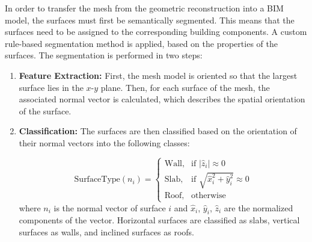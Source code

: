 \begin{English}
    In order to transfer the mesh from the geometric reconstruction into a BIM model, the surfaces must first be semantically segmented. This means that the surfaces need to be assigned to the corresponding building components. A custom rule-based segmentation method is applied, based on the properties of the surfaces. The segmentation is performed in two steps:

    \begin{enumerate}
        \item \textbf{Feature Extraction:} First, the mesh model is oriented so that the largest surface lies in the $x$-$y$ plane. Then, for each surface of the mesh, the associated normal vector is calculated, which describes the spatial orientation of the surface.
        \item \textbf{Classification:} The surfaces are then classified based on the orientation of their normal vectors into the following classes:
        
        \begin{equation*}
        \text{SurfaceType}(n_i) = 
        \begin{cases}
            \text{Wall}, & \text{if } |\hat{z}_i| \approx 0 \\
            \text{Slab}, & \text{if } \sqrt{\hat{x}_i^2 + \hat{y}_i^2} \approx 0 \\
            \text{Roof}, & \text{otherwise}
        \end{cases}
        \end{equation*}
        where $n_i$ is the normal vector of surface $i$ and $\hat{x}_i$, $\hat{y}_i$, $\hat{z}_i$ are the normalized components of the vector. Horizontal surfaces are classified as slabs, vertical surfaces as walls, and inclined surfaces as roofs.
    \end{enumerate}
\end{English}

